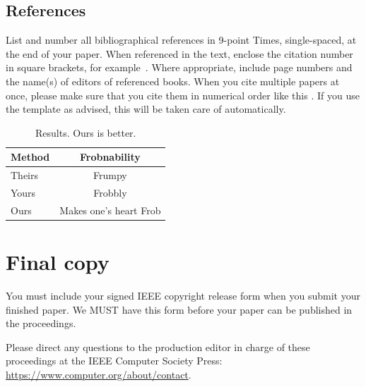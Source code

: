 \documentclass[10pt,twocolumn,letterpaper]{article}
\begin{document}
\subsection{References}

List and number all bibliographical references in 9-point Times, single-spaced, at the end of your paper.
When referenced in the text, enclose the citation number in square brackets, for
example~\cite{Authors14}.
Where appropriate, include page numbers and the name(s) of editors of referenced books.
When you cite multiple papers at once, please make sure that you cite them in numerical order like this \cite{Alpher02,Alpher03,Alpher05,Authors14b,Authors14}.
If you use the template as advised, this will be taken care of automatically.

\begin{table}
  \centering
  \begin{tabular}{@{}lc@{}}
    \toprule
    Method & Frobnability \\
    \midrule
    Theirs & Frumpy \\
    Yours & Frobbly \\
    Ours & Makes one's heart Frob\\
    \bottomrule
  \end{tabular}
  \caption{Results.   Ours is better.}
  \label{tab:example}
\end{table}

\section{Final copy}

You must include your signed IEEE copyright release form when you submit your finished paper.
We MUST have this form before your paper can be published in the proceedings.

Please direct any questions to the production editor in charge of these proceedings at the IEEE Computer Society Press:
\url{https://www.computer.org/about/contact}.


{\small


}
\end{document}

